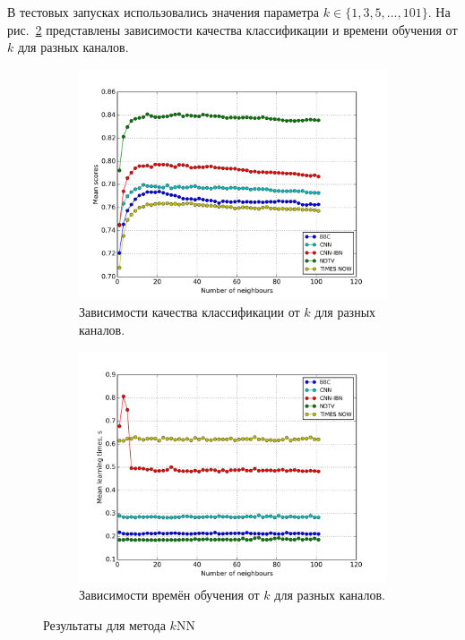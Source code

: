 В тестовых запусках использовались значения параметра \(k\in\{1,3,5,\dotsc,101\}\). На рис.~\ref{fig:knn-base} представлены зависимости качества классификации и времени обучения от \(k\) для разных каналов.
\begin{figure}[h!]
    \centering
	\begin{subfigure}{0.45\textwidth}
		\includegraphics[width=\textwidth]{images/knn.png}
		\caption{Зависимости качества классификации от \(k\) для разных каналов.}\label{fig:knn-base-scores}
	\end{subfigure}
	\begin{subfigure}{0.45\textwidth}
		\includegraphics[width=\textwidth]{images/knnTime.png}
		\caption{Зависимости времён обучения от \(k\) для разных каналов.}
	\end{subfigure}
	\caption{Результаты для метода \(k\)NN}\label{fig:knn-base}
\end{figure}

